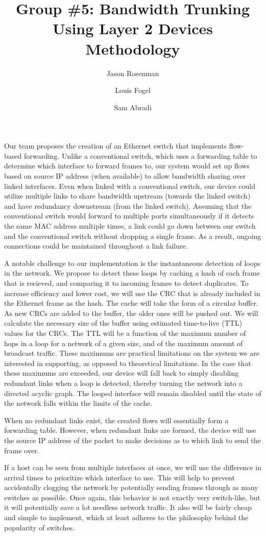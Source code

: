 \documentclass{article}
\title{Group \#5: Bandwidth Trunking Using Layer 2 Devices\\Methodology}
\author{Jason Rosenman \and Louis Fogel \and Sam Abradi}
\date{}
\begin{document}
\maketitle
	Our team proposes the creation of an Ethernet switch that implements flow-based forwarding.
	Unlike a conventional switch, which uses a forwarding table to determine which interface to forward frames to, our system would set up flows based on source IP address (when available) to allow bandwidth sharing over linked interfaces.
	Even when linked with a conventional switch, our device could utilize multiple links to share bandwidth upstream (towards the linked switch) and have redundancy downstream (from the linked switch).
	Assuming that the conventional switch would forward to multiple ports simultaneously if it detects the same MAC address multiple times, a link could go down between our switch and the conventional switch without dropping a single frame.
	As a result, ongoing connections could be maintained throughout a link failure.

	A notable challenge to our implementation is the instantaneous detection of loops in the network.
	We propose to detect these loops by caching a hash of each frame that is recieved, and comparing it to incoming frames to detect duplicates.
	To increase efficiency and lower cost, we will use the CRC that is already included in the Ethernet frame as the hash.
	The cache will take the form of a circular buffer.
	As new CRCs are added to the buffer, the older ones will be pushed out.
	We will calculate the necessary size of the buffer using estimated time-to-live (TTL) values for the CRCs.
	The TTL will be a function of the maximum number of hops in a loop for a network of a given size, and of the maximum amount of broadcast traffic.
	These maximums are practical limitations on the system we are interested in supporting, as opposed to theoretical limitations.
	In the case that these maximums are exceeded, our device will fall back to simply disabling redundant links when a loop is detected, thereby turning the network into a directed acyclic graph.
	The looped interface will remain disabled until the state of the network falls within the limits of the cache.
	
	When no redundant links exist, the created flows will essentially form a forwarding table.
	However, when redundant links are formed, the device will use the source IP address of the packet to make decisions as to which link to send the frame over.

	If a host can be seen from multiple interfaces at once, we will use the difference in arrival times to prioritize which interface to use.
	This will help to prevent accidentally clogging the network by potentially sending frames through as many switches as possible. Once again, this behavior is not exactly very switch-like, but it will potentially save a lot needless network traffic. 
	It also will be fairly cheap and simple to implement, which at least adheres to the philosophy behind the popularity of switches.
\end{document}
